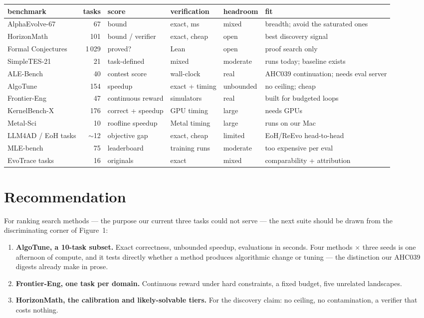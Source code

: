 \documentclass[11pt]{article}
\begin{document}
\begin{center}\small
\begin{tabular}{@{}>{\raggedright\arraybackslash}p{30mm}rp{24mm}p{22mm}p{18mm}p{44mm}@{}}
\toprule
benchmark & tasks & score & verification & headroom & fit \\
\midrule
AlphaEvolve-67 & 67 & bound & exact, ms & mixed & breadth; avoid the saturated ones \\
HorizonMath & 101 & bound / verifier & exact, cheap & open & best discovery signal \\
Formal Conjectures & 1\,029 & proved? & Lean & open & proof search only \\
SimpleTES-21 & 21 & task-defined & mixed & moderate & runs today; baseline exists \\
ALE-Bench & 40 & contest score & wall-clock & real & AHC039 continuation; needs eval server \\
AlgoTune & 154 & speedup & exact + timing & unbounded & no ceiling; cheap \\
Frontier-Eng & 47 & continuous reward & simulators & real & built for budgeted loops \\
KernelBench-X & 176 & correct + speedup & GPU timing & large & needs GPUs \\
Metal-Sci & 10 & roofline speedup & Metal timing & large & runs on our Mac \\
LLM4AD / EoH tasks & $\sim$12 & objective gap & exact, cheap & limited & EoH/ReEvo head-to-head \\
MLE-bench & 75 & leaderboard & training runs & moderate & too expensive per eval \\
EvoTrace tasks & 16 & originals & exact & mixed & comparability + attribution \\
\bottomrule
\end{tabular}
\end{center}

\section{Recommendation}

For ranking search methods --- the purpose our current three tasks could not serve --- the next
suite should be drawn from the discriminating corner of Figure~1:

\begin{enumerate}
  \item \textbf{AlgoTune, a 10-task subset.} Exact correctness, unbounded speedup, evaluations in
    seconds. Four methods $\times$ three seeds is one afternoon of compute, and it tests directly
    whether a method produces algorithmic change or tuning --- the distinction our AHC039 digests
    already make in prose.
  \item \textbf{Frontier-Eng, one task per domain.} Continuous reward under hard constraints, a
    fixed budget, five unrelated landscapes.
  \item \textbf{HorizonMath, the calibration and likely-solvable tiers.} For the discovery claim:
    no ceiling, no contamination, a verifier that costs nothing.
\end{enumerate}
\end{document}
